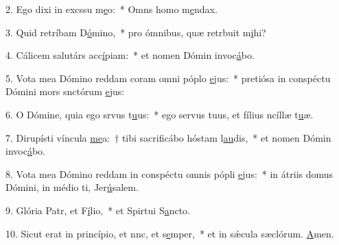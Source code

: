 2. Ego dixi in excssu m\uline{e}o:~* Omns homo m\uline{e}ndax.\par 
3. Quid retríbam D\uline{ó}mino,~* pro ómnibus, quæ retrbuit m\uline{i}hi?\par 
4. Cálicem salutárs acc\uline{í}piam:~* et nomen Dómin invoc\uline{á}bo.\par 
5. Vota mea Dómino reddam coram omni póplo \uline{e}jus:~* pretiósa in conspéctu Dómini mors snctórum \uline{e}jus:\par 
6. O Dómine, quia ego srvus t\uline{u}us:~* ego servus tuus, et fílius ncíllæ t\uline{u}æ.\par 
7. Dirupísti víncula \uline{me}a:~† tibi sacrificábo hóstam l\uline{au}dis,~* et nomen Dómin invoc\uline{á}bo.\par 
8. Vota mea Dómino reddam in conspéctu omnis pópli \uline{e}jus:~* in átriis domus Dómini, in médio ti, Jer\uline{ú}salem.\par 
9. Glória Patr, et F\uline{í}lio,~* et Spirtui S\uline{a}ncto.\par 
10. Sicut erat in princípio, et nnc, et s\uline{e}mper,~* et in sǽcula sæclórum. \uline{A}men.\par 
